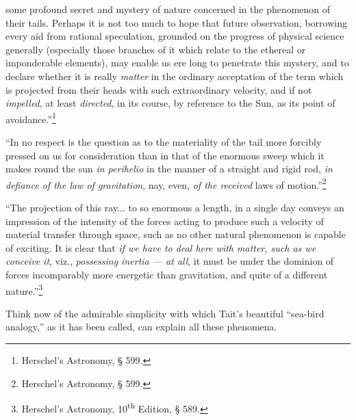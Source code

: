 \documentclass[a4paper, 11pt, oneside, english]{article}
\begin{document}
some profound secret and mystery of nature concerned in the phenomenon of their tails. Perhaps it is not too much to hope that future observation, borrowing every aid from rational speculation, grounded on the progress of physical science generally (especially those branches of it which relate to the ethereal or imponderable elements), may enable us ere long to penetrate this mystery, and to declare whether it is really \emph{matter} in the ordinary acceptation of the term which is projected from their heads with such extraordinary velocity, and if not \emph{impelled}, at least \emph{directed}, in its course, by reference to the Sun, as its point of avoidance.''\footnote{Herschel's Astronomy, \S\hspace*{1mm} 599.}

``In no respect is the question as to the materiality of the tail more forcibly pressed on us for consideration than in that of the enormous sweep which it makes round the sun \emph{in perihelio} in the manner of a straight and rigid rod, \emph{in defiance of the law of gravitation}, nay, even, \emph{of the received} laws of motion.''\footnote{Herschel's Astronomy, \S\hspace*{1mm} 599.}

``The projection of this ray... to so enormous a length, in a single day conveys an impression of the intensity of the forces acting to produce such a velocity of material transfer through space, such as no other natural phenomenon is capable of exciting. It is clear that \emph{if we have to deal here with matter, such as we conceive it}, viz., \emph{possessing inertia --- at all}, it must be under the dominion of forces incomparably more energetic than gravitation, and quite of a different nature.''\footnote{Herschel's Astronomy, 10\textsuperscript{th} Edition, \S\hspace*{1mm} 589.}

Think now of the admirable simplicity with which Tait's beautiful ``sea-bird analogy,'' as it has been called, can explain all these phenomena.
\end{document}

